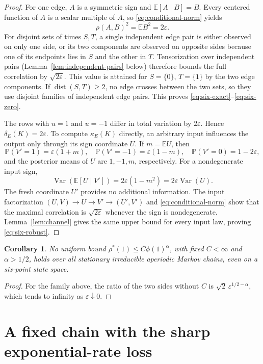 \documentclass[11pt]{amsart}
\numberwithin{equation}{section}
\newtheorem{corollary}[theorem]{Corollary}
\theoremstyle{definition}
\newcommand{\PP}{\mathbb P}
\newcommand{\EE}{\mathbb E}
\newcommand{\Var}{\operatorname{Var}}
\newcommand{\dist}{\operatorname{dist}}
\newcommand{\rhostar}{\rho^{*}}
\begin{document}
\begin{proof}
For one edge, $A$ is a symmetric sign and $\EE[A\mid B]=B$. Every centered function of $A$ is a scalar multiple of $A$, so \eqref{eq:conditional-norm} yields
\begin{equation}\label{eq:edge-rho}
\rho(A,B)^2=\EE B^2=2\varepsilon.
\end{equation}
For disjoint sets of times $S,T$, a single independent edge pair is either observed on only one side, or its two components are observed on opposite sides because one of its endpoints lies in $S$ and the other in $T$. Tensorization over independent pairs (Lemma~\ref{lem:independent-pairs} below) therefore bounds the full correlation by $\sqrt{2\varepsilon}$. This value is attained for $S=\{0\}$, $T=\{1\}$ by the two edge components. If $\dist(S,T)\ge2$, no edge crosses between the two sets, so they use disjoint families of independent edge pairs. This proves \eqref{eq:six-exact}--\eqref{eq:six-zero}.

The rows with $u=1$ and $u=-1$ differ in total variation by $2\varepsilon$. Hence $\delta_E(K)=2\varepsilon$. To compute $\kappa_E(K)$ directly, an arbitrary input influences the output only through its sign coordinate $U$. If $m=\EE U$, then
\[
\PP(V'=1)=\varepsilon(1+m),\quad
\PP(V'=-1)=\varepsilon(1-m),\quad
\PP(V'=0)=1-2\varepsilon,
\]
and the posterior means of $U$ are $1,-1,m$, respectively. For a nondegenerate input sign,
\[
\Var(\EE[U\mid V'])=2\varepsilon(1-m^2)
=2\varepsilon\Var(U).
\]
The fresh coordinate $U'$ provides no additional information. The input factorization $(U,V)\to U\to V'\to(U',V')$ and \eqref{eq:conditional-norm} show that the maximal correlation is $\sqrt{2\varepsilon}$ whenever the sign is nondegenerate. Lemma~\ref{lem:channel} gives the same upper bound for every input law, proving \eqref{eq:six-robust}.
\end{proof}

\begin{corollary}
No uniform bound $\rhostar(1)\le C\phi(1)^\alpha$, with fixed $C<\infty$ and $\alpha>1/2$, holds over all stationary irreducible aperiodic Markov chains, even on a six-point state space.
\end{corollary}

\begin{proof}
For the family above, the ratio of the two sides without $C$ is $\sqrt2\,\varepsilon^{1/2-\alpha}$, which tends to infinity as $\varepsilon\downarrow0$.
\end{proof}

\section{A fixed chain with the sharp exponential-rate loss}\label{sec:reset}
\end{document}
